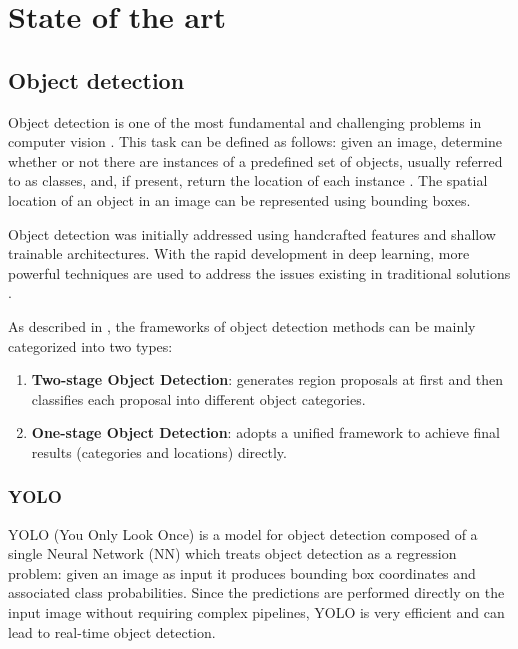 \chapter{State of the art}
\label{chap:sota}

\section{Object detection}

Object detection is one of the most fundamental and challenging problems in computer vision \cite{zou2019object}. This task can be defined as follows: given an image, determine whether or not there are instances of a predefined set of objects, usually referred to as classes, and, if present, return the location of each instance \cite{liu2020deep}. The spatial location of an object in an image can be represented using bounding boxes.

Object detection was initially addressed using handcrafted features and shallow trainable architectures.
With the rapid development in deep learning, more powerful techniques are used to address the issues existing in traditional solutions \cite{zhao2019object}. 

As described in \cite{zhao2019object}, the frameworks of object detection methods can be mainly categorized into two types:
\begin{enumerate}
    \item \textbf{Two-stage Object Detection}: generates region proposals at first and then classifies each proposal into different object categories.
    \item \textbf{One-stage Object Detection}: adopts a unified framework to achieve final results (categories and locations) directly.
\end{enumerate} 

\subsection{YOLO}
\label{sec:yolo}
YOLO (You Only Look Once) \cite{redmon2016you} is a model for object detection composed of a single Neural Network (NN) which treats object detection as a regression problem: given an image as input it produces bounding box coordinates and associated class probabilities. Since the predictions are performed directly on the input image without requiring complex pipelines, YOLO is very efficient and can lead to real-time object detection.

